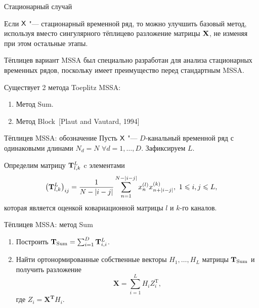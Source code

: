 \documentclass[ucs, notheorems, handout]{beamer}
\begin{document}
\begin{frame}{Стационарный случай}

	
	Если $\mathsf{X}$ "--- стационарный временной ряд, то можно улучшить базовый метод, используя вместо сингулярного тёплицево разложение матрицы $\mathbf{X}$, не изменяя при этом остальные этапы.\medskip
	
	Тёплицев вариант MSSA был специально разработан для анализа стационарных временных рядов, поскольку имеет преимущество перед стандартным MSSA. \medskip
	
	Существует 2 метода Toeplitz MSSA:\medskip
	\begin{enumerate}
		\item Метод Sum.\medskip
		\item Метод Block~[Plaut and Vautard, 1994]\medskip
	\end{enumerate}
	
\end{frame}
\begin{frame}{Тёплицев MSSA: обозначение}
	Пусть $\mathsf{X}$ "--- $D$-канальный временной ряд с одинаковыми длинами $N_d=N$ $\forall d=1,\ldots,D$. Зафиксируем $L$.\medskip
	
	Определим матрицу $\mathbf{T}_{l,k}^{L}$ c элементами
	\begin{equation*}\label{eq:block_elements}
	\left(\mathbf{T}^L_{l,k}\right)_{ij}=\frac{1}{N-|i-j|}\sum_{n=1}^{N-|i-j|} x^{(l)}_nx^{(k)}_{n+|i-j|},\ 1\leqslant i,j\leqslant L,
	\end{equation*}
	которая является оценкой ковариационной матрицы $l$ и $k$-го каналов.
\end{frame}
\begin{frame}{Тёплицев MSSA: метод Sum}
	\begin{enumerate}
		\item Построить $\mathbf{T}_{\text{Sum}}=\sum_{i=1}^D \mathbf{T}^{L}_{i,i}$.\medskip
		\item Найти ортонормированные собственные векторы $H_1,\ldots,H_L$ матрицы $\mathbf{T}_{\text{Sum}}$ и получить разложение
		\begin{equation*}
			\mathbf{X}=\sum_{i=1}^L H_i Z_i^\mathrm{T},
		\end{equation*}
		где $Z_i=\mathbf{X^T}H_i$.
	\end{enumerate}
\end{frame}
\end{document}
